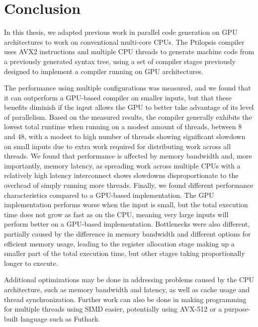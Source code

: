 \documentclass[11pt,dvipsnames]{article}
\begin{document}
\section{Conclusion} \label{conclusion}
In this thesis, we adapted previous work in parallel code generation on GPU architectures to work on conventional multi-core CPUs. The Ptilopsis compiler uses AVX2 instructions and multiple CPU threads to generate machine code from a previously generated syntax tree, using a set of compiler stages previously designed to implement a compiler running on GPU architectures.

The performance using multiple configurations was measured, and we found that it can outperform a GPU-based compiler on smaller inputs, but that these benefits diminish if the input allows the GPU to better take advantage of its level of parallelism. Based on the measured results, the compiler generally exhibits the lowest total runtime when running on a modest amount of threads, between 8 and 48, with a modest to high number of threads showing significant slowdown on small inputs due to extra work required for distributing work across all threads. We found that performance is affected by memory bandwidth and, more importantly, memory latency, as spreading work across multiple CPUs with a relatively high latency interconnect shows slowdowns disproportionate to the overhead of simply running more threads. Finally, we found different performance characteristics compared to a GPU-based implementation. The GPU implementation performs worse when the input is small, but the total execution time does not grow as fast as on the CPU, meaning very large inputs will perform better on a GPU-based implementation. Bottlenecks were also different, partially caused by the difference in memory bandwidth and different options for efficient memory usage, leading to the register allocation stage making up a smaller part of the total execution time, but other stages taking proportionally longer to execute.

Additional optimizations may be done in addressing problems caused by the CPU architecture, such as memory bandwidth and latency, as well as cache usage and thread synchronization. Further work can also be done in making programming for multiple threads using SIMD easier, potentially using AVX-512 or a purpose-built language such as Futhark. 




\appendix
\end{document}

